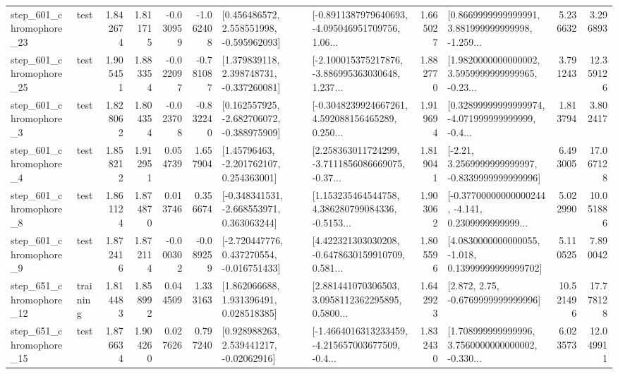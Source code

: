 \begin{tabular}{llrrrrllrlrr}
  step\_601\_chromophore\_23 &      test &      1.842674 &    1.811715 &     -0.030959 & -1.062408 &    [0.456486572, 2.558551998, -0.595962093] &  [-0.8911387979640693, -4.095046951709756, 1.06... &       1.665027 &  [0.8669999999999991, 3.881999999999998, -1.259... &            5.236632 &          3.296893 \\
  step\_601\_chromophore\_25 &      test &      1.905451 &    1.883354 &     -0.022097 & -0.781087 &    [1.379839118, 2.398748731, -0.337260081] &  [-2.100015375217876, -3.886995363030648, 1.237... &       1.882770 &  [1.9820000000000002, 3.5959999999999965, -0.23... &            3.791243 &         12.359126 \\
   step\_601\_chromophore\_3 &      test &      1.828062 &    1.804354 &     -0.023708 & -0.832240 &   [0.162557925, -2.682706072, -0.388975909] &  [-0.3048239924667261, 4.592088156465289, 0.250... &       1.919694 &  [0.32899999999999974, -4.071999999999999, -0.4... &            1.813794 &          3.802417 \\
   step\_601\_chromophore\_4 &      test &      1.858212 &    1.912951 &      0.054739 &  1.657904 &     [1.45796463, -2.201762107, 0.254363001] &  [2.258363011724299, -3.7111856086669075, -0.37... &       1.819041 &   [-2.21, 3.2569999999999997, -0.8339999999999996] &            6.493005 &         17.067128 \\
   step\_601\_chromophore\_8 &      test &      1.861124 &    1.874870 &      0.013746 &  0.356674 &   [-0.348341531, -2.668553971, 0.363063244] &  [1.153235464544758, 4.386280799084336, -0.5153... &       1.903062 &  [-0.37700000000000244, -4.141, 0.2309999999999... &            5.022990 &         10.051886 \\
   step\_601\_chromophore\_9 &      test &      1.872416 &    1.872114 &     -0.000302 & -0.089259 &   [-2.720447776, 0.437270554, -0.016751433] &  [4.422321303030208, -0.6478630159910709, 0.581... &       1.805596 &  [4.0830000000000055, -1.018, 0.13999999999999702] &            5.110525 &          7.890042 \\
  step\_651\_chromophore\_12 &  training &      1.814483 &    1.858992 &      0.044509 &  1.333163 &     [1.862066688, 1.931396491, 0.028518385] &  [2.881441070306503, 3.0958112362295895, 0.5800... &       1.642923 &                 [2.872, 2.75, -0.6769999999999996] &           10.521496 &         17.778128 \\
  step\_651\_chromophore\_15 &      test &      1.876634 &    1.904260 &      0.027626 &  0.797240 &     [0.928988263, 2.539441217, -0.02062916] &  [-1.4664016313233459, -4.215657003677509, -0.4... &       1.832430 &  [1.708999999999996, 3.7560000000000002, -0.330... &            6.023573 &         12.049911 \\

\end{tabular}

